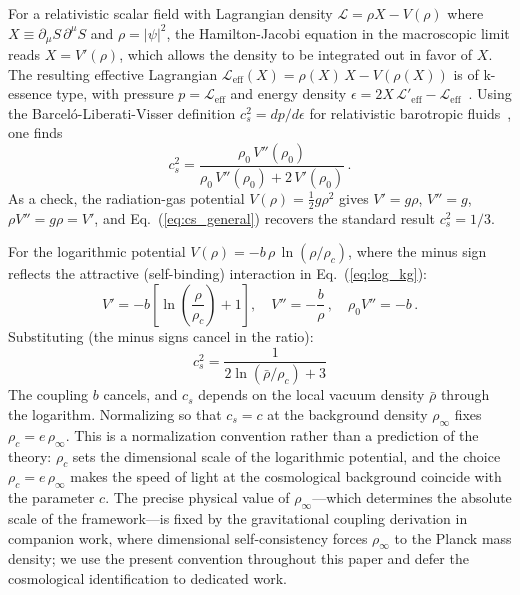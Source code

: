\documentclass[12pt, a4paper]{article}
\begin{document}
For a relativistic scalar field with Lagrangian density $\mathcal{L} = \rho X - V(\rho)$ where $X \equiv \partial_\mu S\,\partial^\mu S$ and $\rho = |\psi|^2$, the Hamilton-Jacobi equation in the macroscopic limit reads $X = V'(\rho)$, which allows the density to be integrated out in favor of $X$. The resulting effective Lagrangian $\mathcal{L}_{\mathrm{eff}}(X) = \rho(X)\,X - V(\rho(X))$ is of k-essence type, with pressure $p = \mathcal{L}_{\mathrm{eff}}$ and energy density $\epsilon = 2X\,\mathcal{L}'_{\mathrm{eff}} - \mathcal{L}_{\mathrm{eff}}$~\cite{babichev_mukhanov_vikman_2008}. Using the Barcel\'{o}-Liberati-Visser definition $c_s^2 = dp/d\epsilon$ for relativistic barotropic fluids~\cite{barcelo_liberati_visser_2005}, one finds
\begin{equation}
    c_s^2 = \frac{\rho_0\,V''(\rho_0)}{\rho_0\,V''(\rho_0) + 2\,V'(\rho_0)}\,.
\label{eq:cs_general}
\end{equation}
As a check, the radiation-gas potential $V(\rho) = \tfrac{1}{2}g\rho^2$ gives $V' = g\rho$, $V'' = g$, $\rho V'' = g\rho = V'$, and Eq.~(\ref{eq:cs_general}) recovers the standard result $c_s^2 = 1/3$.

For the logarithmic potential $V(\rho) = -b\,\rho\,\ln(\rho/\rho_c)$, where the minus sign reflects the attractive (self-binding) interaction in Eq.~(\ref{eq:log_kg}):
\begin{equation}
    V' = -b\!\left[\ln\!\left(\frac{\rho}{\rho_c}\right) + 1\right]\!,\quad V'' = -\frac{b}{\rho}\,,\quad \rho_0 V'' = -b\,.
\end{equation}
Substituting (the minus signs cancel in the ratio):
\begin{equation}
    \boxed{\;c_s^2 = \frac{1}{2\ln(\bar{\rho}/\rho_c) + 3}\;}
\label{eq:cs_log}
\end{equation}
The coupling $b$ cancels, and $c_s$ depends on the local vacuum density $\bar{\rho}$ through the logarithm. Normalizing so that $c_s = c$ at the background density $\rho_\infty$ fixes $\rho_c = e\,\rho_\infty$. This is a normalization convention rather than a prediction of the theory: $\rho_c$ sets the dimensional scale of the logarithmic potential, and the choice $\rho_c = e\,\rho_\infty$ makes the speed of light at the cosmological background coincide with the parameter $c$. The precise physical value of $\rho_\infty$---which determines the absolute scale of the framework---is fixed by the gravitational coupling derivation in companion work, where dimensional self-consistency forces $\rho_\infty$ to the Planck mass density; we use the present convention throughout this paper and defer the cosmological identification to dedicated work.
\end{document}
